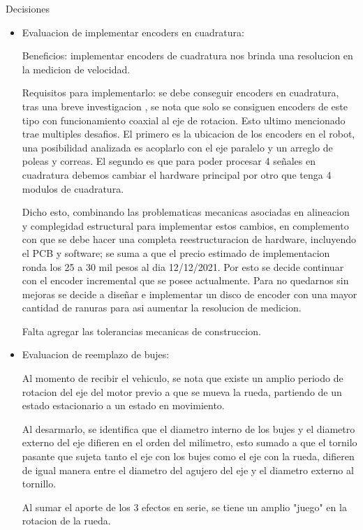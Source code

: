     {\LARGE Decisiones}

    \begin{itemize}
        \item Evaluacion de implementar encoders en cuadratura: 
        
        Beneficios: implementar encoders de cuadratura nos brinda una resolucion en la medicion de velocidad.

        Requisitos para implementarlo: se debe conseguir encoders en cuadratura, tras una breve investigacion , se nota que solo se consiguen encoders de este tipo con funcionamiento coaxial al eje de rotacion. 
        Esto ultimo mencionado trae multiples desafios.
        El primero es la ubicacion de los encoders en el robot, una posibilidad analizada es acoplarlo con el eje paralelo y un arreglo de poleas y correas.
        El segundo es que para poder procesar 4 señales en cuadratura debemos cambiar el hardware principal por otro que tenga 4 modulos de cuadratura.

        Dicho esto, combinando las problematicas mecanicas asociadas en alineacion y complegidad estructural para implementar estos cambios, en complemento con que se debe hacer una completa reestructuracion de hardware, incluyendo el PCB y software; se suma a que el precio estimado de implementacion ronda los 25 a 30 mil pesos al dia 12/12/2021.
        Por esto se decide continuar con el encoder incremental que se posee actualmente.
        Para no quedarnos sin mejoras se decide a diseñar e implementar un disco de encoder con una mayor cantidad de ranuras para asi aumentar la resolucion de medicion.

        Falta agregar las tolerancias mecanicas de construccion.

        \item Evaluacion de reemplazo de bujes:
        
        Al momento de recibir el vehiculo, se nota que existe un amplio periodo de rotacion del eje del motor previo a que se mueva la rueda, partiendo de un estado estacionario a un estado en movimiento.

        Al desarmarlo, se identifica que el diametro interno de los bujes y el diametro externo del eje difieren en el orden del milimetro, esto sumado a que el tornilo pasante que sujeta tanto el eje con los bujes como el eje con la rueda, difieren de igual manera entre el diametro del agujero del eje y el diametro externo al tornillo.

        Al sumar el aporte de los 3 efectos en serie, se tiene un amplio "juego" en la rotacion de la rueda.


\end{itemize}
